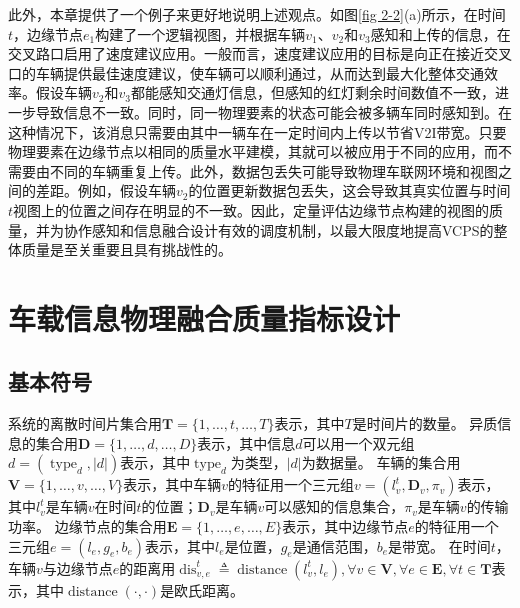 此外，本章提供了一个例子来更好地说明上述观点。如图\ref{fig 2-2}(a)所示，在时间 $t$，边缘节点$e_1$构建了一个逻辑视图，并根据车辆$v_1$、$v_2$和$v_3$感知和上传的信息，在交叉路口启用了速度建议应用。一般而言，速度建议应用的目标是向正在接近交叉口的车辆提供最佳速度建议，使车辆可以顺利通过，从而达到最大化整体交通效率。假设车辆$v_2$和$v_3$都能感知交通灯信息，但感知的红灯剩余时间数值不一致，进一步导致信息不一致。同时，同一物理要素的状态可能会被多辆车同时感知到。在这种情况下，该消息只需要由其中一辆车在一定时间内上传以节省V2I带宽。只要物理要素在边缘节点以相同的质量水平建模，其就可以被应用于不同的应用，而不需要由不同的车辆重复上传。此外，数据包丢失可能导致物理车联网环境和视图之间的差距。例如，假设车辆$v_2$的位置更新数据包丢失，这会导致其真实位置与时间$t$视图上的位置之间存在明显的不一致。因此，定量评估边缘节点构建的视图的质量，并为协作感知和信息融合设计有效的调度机制，以最大限度地提高VCPS的整体质量是至关重要且具有挑战性的。

\section{车载信息物理融合质量指标设计}\label{section 2-4}

\subsection{基本符号}

系统的离散时间片集合用$\mathbf{T}=\{1, \ldots, t, \ldots, T\}$表示，其中$T$是时间片的数量。
异质信息的集合用$\mathbf{D}=\{1, \ldots, d, \ldots, D\}$表示，其中信息$d$可以用一个双元组$d=\left(\operatorname{type}_d, \left|d\right| \right)$表示，其中$\operatorname{type}_d$为类型，$\left|d\right|$为数据量。
车辆的集合用$\mathbf{V}=\{1, \ldots, v, \ldots, V\}$表示，其中车辆$v$的特征用一个三元组$v=\left (l_v^t, \mathbf{D}_v, \pi_v \right )$表示，其中$l_v^t$是车辆$v$在时间$t$的位置；$\mathbf{D}_v$是车辆$v$可以感知的信息集合，$\pi_v$是车辆$v$的传输功率。
边缘节点的集合用$\mathbf{E}=\{1, \ldots, e, \ldots, E\}$表示，其中边缘节点$e$的特征用一个三元组$e=\left (l_e, g_e, b_e \right)$表示，其中$l_e$是位置，$g_e$是通信范围，$b_e$是带宽。
在时间$t$，车辆$v$与边缘节点$e$的距离用$\operatorname{dis}_{v,e}^t \triangleq \operatorname{distance} \left (l_v^t, l_e \right ), \forall v \in \mathbf{V}, \forall e \in \mathbf{E}, \forall t \in \mathbf{T}$表示，其中$\operatorname{distance}\left(\cdot,\cdot\right)$是欧氏距离。

